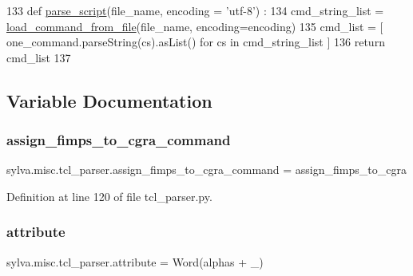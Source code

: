 \begin{DoxyCode}
133 \textcolor{keyword}{def }\hyperlink{namespacesylva_1_1misc_1_1tcl__parser_aab59812e931f24c8e7d1cbffd2fe587e}{parse\_script}(file\_name, encoding = 'utf-8') :
134   cmd\_string\_list = \hyperlink{namespacesylva_1_1misc_1_1tcl__parser_a3a51f30aa622037c144676d280943caa}{load\_command\_from\_file}(file\_name, encoding=encoding)
135   cmd\_list = [ one\_command.parseString(cs).asList() \textcolor{keywordflow}{for} cs \textcolor{keywordflow}{in} cmd\_string\_list ]
136   \textcolor{keywordflow}{return} cmd\_list
137 \end{DoxyCode}


\subsection{Variable Documentation}
\mbox{\label{namespacesylva_1_1misc_1_1tcl__parser_a2cff869e2129abd80f1679cc0becad35}} 
\subsubsection{\texorpdfstring{assign\+\_\+fimps\+\_\+to\+\_\+cgra\+\_\+command}{assign\_fimps\_to\_cgra\_command}}
{\footnotesize\ttfamily sylva.\+misc.\+tcl\+\_\+parser.\+assign\+\_\+fimps\+\_\+to\+\_\+cgra\+\_\+command = assign\+\_\+fimps\+\_\+to\+\_\+cgra}



Definition at line 120 of file tcl\+\_\+parser.\+py.

\mbox{\label{namespacesylva_1_1misc_1_1tcl__parser_ade6aa1a9697fd50d76f10d8ef7474363}} 
\subsubsection{\texorpdfstring{attribute}{attribute}}
{\footnotesize\ttfamily sylva.\+misc.\+tcl\+\_\+parser.\+attribute = Word(alphas + \textquotesingle{}\+\_\+\textquotesingle{})}



